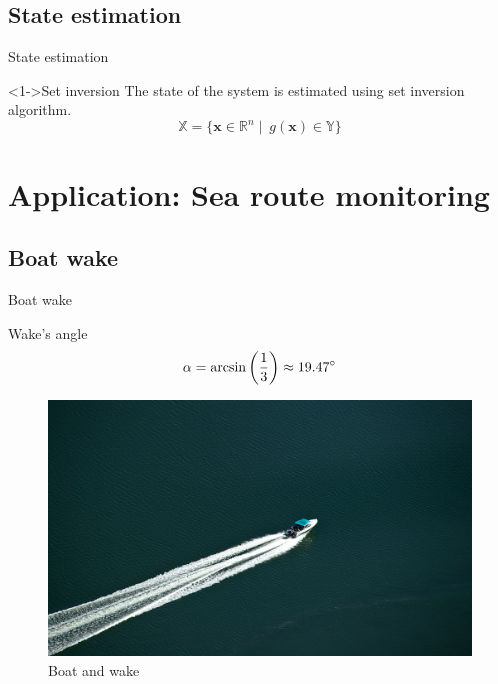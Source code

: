 \documentclass{beamer}
\begin{document}
        \subsection{State estimation}

            \begin{frame}{State estimation}
                \begin{block}<1->{Set inversion}
                    The state of the system is estimated using set inversion algorithm.
                    \begin{equation}
                        \mathbb{X} = \lbrace \mathbf{x} \in \mathbb{R}^n \mid\ g(\mathbf{x}) \in \mathbb{Y}\rbrace
                    \end{equation}
                \end{block}
            \end{frame}

    \section{Application: Sea route monitoring}

        \subsection{Boat wake}

            \begin{frame}{Boat wake}
                \centering
                \begin{minipage}{0.6\textwidth}
                    \begin{block}{Wake's angle}
                        \begin{equation}
                            \alpha = \arcsin\left(\frac{1}{3}\right) \approx 19.47 \degree
                        \end{equation}
                    \end{block}
                    \vspace{0.2cm}
                    \begin{figure}
                        \centering
                        \includegraphics[width=\textwidth,trim={0 0 17cm 14cm},clip]{imgs/motorboat}
                        \caption{Boat and wake}
                    \end{figure}
                \end{minipage}
            \end{frame}
        
\end{document}
